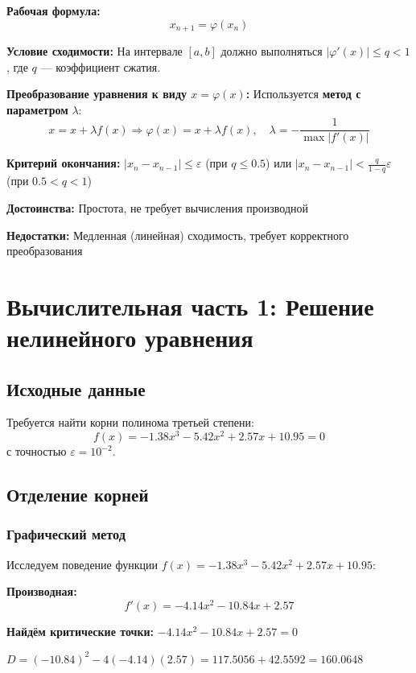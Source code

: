 \documentclass[a4paper,12pt]{article}
\begin{document}
\textbf{Рабочая формула:}
\[
    x_{n+1} = \varphi(x_n)
\]

\textbf{Условие сходимости:} На интервале $[a, b]$ должно выполняться $|\varphi'(x)| \leq q < 1$,
где $q$ --- коэффициент сжатия.

\textbf{Преобразование уравнения к виду $x = \varphi(x)$:}
Используется \textbf{метод с параметром} $\lambda$:
\[
    x = x + \lambda f(x) \Rightarrow \varphi(x) = x + \lambda f(x), \quad \lambda = -\frac{1}{\max|f'(x)|}
\]

\textbf{Критерий окончания:} $|x_n - x_{n-1}| \leq \varepsilon$ (при $q \leq 0.5$) или $|x_n - x_{n-1}| < \frac{q}{1-q}\varepsilon$ (при $0.5 < q < 1$)

\textbf{Достоинства:} Простота, не требует вычисления производной

\textbf{Недостатки:} Медленная (линейная) сходимость, требует корректного преобразования

\newpage

\section{Вычислительная часть 1: Решение нелинейного уравнения}

\subsection{Исходные данные}

Требуется найти корни полинома третьей степени:
\[
    f(x) = -1.38x^3 - 5.42x^2 + 2.57x + 10.95 = 0
\]
с точностью $\varepsilon = 10^{-2}$.

\subsection{Отделение корней}

\subsubsection*{Графический метод}

Исследуем поведение функции $f(x) = -1.38x^3 - 5.42x^2 + 2.57x + 10.95$:

\textbf{Производная:}
\[
    f'(x) = -4.14x^2 - 10.84x + 2.57
\]

\textbf{Найдём критические точки:} $-4.14x^2 - 10.84x + 2.57 = 0$

$D = (-10.84)^2 - 4(-4.14)(2.57) = 117.5056 + 42.5592 = 160.0648$
\end{document}
